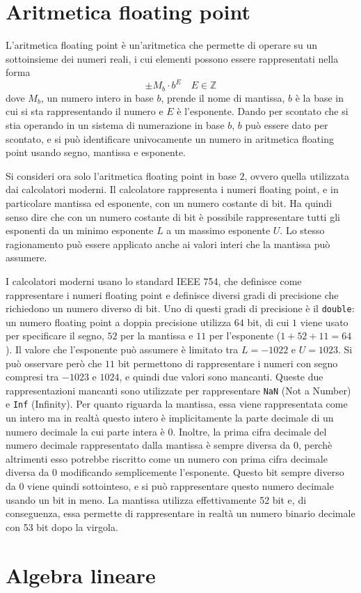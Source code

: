 \chapter{Aritmetica floating point}
L'aritmetica floating point è un'aritmetica che permette di operare su un
sottoinsieme dei numeri reali, i cui elementi possono essere rappresentati
nella forma
\[
    \pm M_b \cdot b^E \quad E \in \mathbb{Z}
\]
dove $M_b$, un numero intero in base $b$, prende il nome di mantissa,
$b$ è la base in cui si sta rappresentando il numero e $E$ è l'esponente.
Dando per scontato che si stia operando in un sistema di numerazione in
base $b$, $b$ può essere dato per scontato, e si può identificare univocamente
un numero in aritmetica floating point usando segno, mantissa e esponente.

Si consideri ora solo l'aritmetica floating point in base $2$, ovvero quella
utilizzata dai calcolatori moderni.
Il calcolatore rappresenta i numeri floating point, e
in particolare mantissa ed esponente, con un numero costante di
bit. Ha quindi senso dire che con un numero costante di bit è
possibile rappresentare tutti gli esponenti da un minimo esponente $L$
a un massimo esponente $U$. Lo stesso ragionamento può essere applicato
anche ai valori interi che la mantissa può assumere.

I calcolatori moderni usano lo standard IEEE 754, che definisce come
rappresentare i numeri floating point e definisce diversi gradi di precisione
che richiedono un numero diverso di bit. Uno di questi gradi di precisione
è il \verb|double|: un numero floating point a doppia precisione utilizza
$64$ bit, di cui $1$ viene usato per specificare il segno, $52$ per la mantissa
e $11$ per l'esponente ($1+52+11=64$).
Il valore che l'esponente può assumere è limitato tra $L=-1022$ e $U=1023$.
Si può osservare però che $11$ bit permettono di rappresentare i numeri con
segno compresi tra $-1023$ e $1024$, e quindi due valori sono mancanti.
Queste due rappresentazioni mancanti sono utilizzate per rappresentare
\verb|NaN| (Not a Number) e \verb|Inf| (Infinity).
Per quanto riguarda la mantissa, essa viene rappresentata come un intero
ma in realtà questo intero è implicitamente la parte decimale di un numero
decimale la cui parte intera è 0. Inoltre, la prima cifra decimale
del numero decimale rappresentato dalla mantissa è sempre diversa da $0$,
perchè altrimenti esso potrebbe riscritto come un numero con prima cifra
decimale diversa da $0$ modificando semplicemente l'esponente.
Questo bit sempre diverso da $0$ viene quindi sottointeso, e si può rappresentare
questo numero decimale usando un bit in meno. La mantissa utilizza
effettivamente 52 bit e, di conseguenza, essa permette di rappresentare
in realtà un numero binario decimale con 53 bit dopo la virgola.

\chapter{Algebra lineare}
